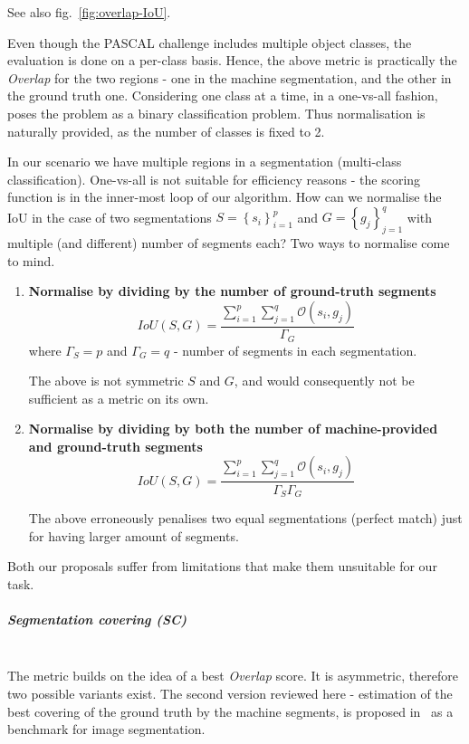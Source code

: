 See also fig.~\ref{fig:overlap-IoU}.

Even though the PASCAL challenge includes multiple object classes, the evaluation is done on a per-class basis. Hence, the above metric is practically the \textit{Overlap} for the two regions - one in the machine segmentation, and the other in the ground truth one. 
Considering one class at a time, in a one-vs-all fashion, poses the problem as a binary classification problem. Thus normalisation is naturally provided, as the number of classes is fixed to 2.

In our scenario we have multiple regions in a segmentation (multi-class classification). One-vs-all is not suitable for efficiency reasons - the scoring function is in the inner-most loop of our algorithm. How can we normalise the IoU in the case of two segmentations $S=\left\{ {s_{i}}\right\} _{i=1}^{p}$
and $G=\left\{ {g_{j}}\right\} _{j=1}^{q}$ with multiple (and different) number of segments each? Two ways to normalise come to mind.

\begin{enumerate}
\item{\textbf{Normalise by dividing by the number of ground-truth segments}}
\[
IoU(S,G)=\frac{\sum\limits _{i=1}^{p}\sum\limits _{j=1}^{q}\mathcal{O}\left(s_{i},g_{j}\right)}{\Gamma_{G}}
\]
where $\Gamma_{S}=p$ and $\Gamma_{G}=q$ - number of segments in each segmentation.

The above is not symmetric \wrt $S$ and $G$, and would consequently not be sufficient as a metric on its own.

\item{\textbf{Normalise by dividing by both the number of machine-provided and ground-truth segments}}
\[
IoU(S,G)=\frac{\sum\limits _{i=1}^{p}\sum\limits _{j=1}^{q}\mathcal{O}\left(s_{i},g_{j}\right)}{\Gamma_{S}\Gamma_{G}}
\]

The above erroneously penalises two equal segmentations (perfect match) just for having larger amount of segments.
\end{enumerate}
Both our proposals suffer from limitations that make them unsuitable for our task.

\subparagraph*{Segmentation covering (SC)}\mbox{}\\
The metric builds on the idea of a best \textit{Overlap} score. 
It is asymmetric, therefore two possible variants exist. The second version reviewed here - estimation of the best covering of the ground truth by the machine segments, is proposed in~\cite{Arbelaez09} as a benchmark for image segmentation.

